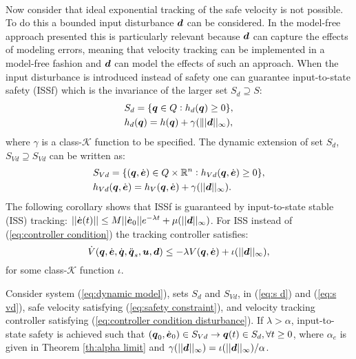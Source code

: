 \\
Now consider that ideal exponential tracking of the safe velocity is not possible. To do this a bounded input disturbance $\boldsymbol{d}$ can be considered. In the model-free approach presented this is particularly relevant because $\boldsymbol{d}$ can capture the effects of modeling errors, meaning that velocity tracking can be implemented in a model-free fashion and $\boldsymbol{d}$ can model the effects of such an approach. When the input disturbance is introduced instead of safety one can guarantee input-to-state safety (ISSf) which is the invariance of the larger set $S_d \supseteq S$:
\begin{equation} \label{eq:s d}
    \begin{split}
        &S_d = \{{\boldsymbol{q}} \in Q: h_d({\boldsymbol{q}})\geq 0 \},\\
        &h_d({\boldsymbol{q}})=h({\boldsymbol{q}}) + \gamma(\||\boldsymbol{d}||_\infty  ),
    \end{split}
\end{equation}
where $\gamma$ is a class-$\mathcal{K}$ function to be specified. The dynamic extension of set $S_d$, $S_{Vd}\supseteq S_{Vd}$ can be written as:
\begin{equation} \label{eq:s vd}
    \begin{split}
        &S_{Vd} = \{({\boldsymbol{q}},\dot{\boldsymbol{e}})\in Q \times \mathbb{R}^n: h_{Vd}({\boldsymbol{q}},\dot{\boldsymbol{e}})\geq 0\},\\
        &h_{Vd}({\boldsymbol{q}},\dot{\boldsymbol{e}}) = h_V({\boldsymbol{q}},\dot{\boldsymbol{e}})+\gamma(||\boldsymbol{d}||_\infty).
    \end{split}
\end{equation}
The following corollary shows that ISSf is guaranteed by input-to-state stable (ISS) tracking: $||\dot{\boldsymbol{e}}(t)|| \leq M ||\dot{\boldsymbol{e}}_0|| e^{-\lambda t}+\mu(||\boldsymbol{d}||_\infty)$. For ISS instead of (\ref{eq:controller condition}) the tracking controller satisfies:
\begin{equation} \label{eq:controller condition disturbance}
    \dot{V}({\boldsymbol{q}},\dot{\boldsymbol{e}},\dot{{\boldsymbol{q}}},\ddot{{\boldsymbol{q}}}_s,\boldsymbol{u},\boldsymbol{d}) \leq -\lambda V({\boldsymbol{q}},\dot{\boldsymbol{e}}) + \iota(||\boldsymbol{d}||_{\infty}),
\end{equation}
for some class-$\mathcal{K}$ function $\iota$.
\begin{theorem}
    Consider system (\ref{eq:dynamic model}), sets $S_d$ and $S_{Vd}$, in (\ref{eq:s d}) and (\ref{eq:s vd}), safe velocity satisfying (\ref{eq:safety constraint}), and velocity tracking controller satisfying (\ref{eq:controller condition disturbance}). If $\lambda > \alpha$, input-to-state safety is achieved such that $({\boldsymbol{q}}_0,\dot{\boldsymbol{e}}_0) \in S_{Vd} \rightarrow {\boldsymbol{q}}(t) \in S_d, \forall t \geq 0$, where $\alpha_e$ is given in Theorem \ref{th:alpha limit} and $\gamma(||\boldsymbol{d}||_\infty)=\iota(||\boldsymbol{d}||_\infty)/\alpha$.
\end{theorem}
